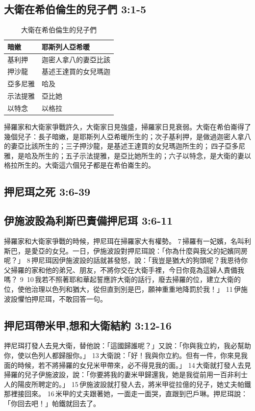 \subsection{大衛在希伯倫生的兒子們 3:1-5}
\begin{table}
\vspace*{-60mm}
\centering 
\begin{tabular}{p{1.5cm}|p{3.85cm}}\hline\hline
暗嫩&耶斯列人亞希暖 \\\hline
基利押&迦密人拿八的妻亞比該\\\hline
押沙龍&基述王達買的女兒瑪迦\\\hline
亞多尼雅&哈及\\\hline
示法提雅&亞比她\\\hline
以特念&以格拉\\\hline
\end{tabular}
\caption{大衛在希伯倫生的兒子們}
\end{table}
掃羅家和大衛家爭戰許久，大衛家日見強盛，掃羅家日見衰弱。大衛在希伯崙得了幾個兒子：長子暗嫩，是耶斯列人亞希暖所生的；次子基利押，是做過迦密人拿八的妻亞比該所生的；三子押沙龍，是基述王達買的女兒瑪迦所生的； 四子亞多尼雅，是哈及所生的；五子示法提雅，是亞比她所生的；六子以特念，是大衛的妻以格拉所生的。大衛這六個兒子都是在希伯崙生的。


\subsection{押尼珥之死 3:6-39}
\subsection{伊施波設為利斯巴責備押尼珥 3:6-11}
掃羅家和大衛家爭戰的時候，押尼珥在掃羅家大有權勢。 7 掃羅有一妃嬪，名叫利斯巴，是愛亞的女兒。一日，伊施波設對押尼珥說：「你為什麼與我父的妃嬪同房呢？」 8 押尼珥因伊施波設的話就甚發怒，說：「我豈是猶大的狗頭呢？我恩待你父掃羅的家和他的弟兄、朋友，不將你交在大衛手裡，今日你竟為這婦人責備我嗎？ 9  10 我若不照著耶和華起誓應許大衛的話行，廢去掃羅的位，建立大衛的位，使他治理以色列和猶大，從但直到別是巴，願神重重地降罰於我！」 11 伊施波設懼怕押尼珥，不敢回答一句。

\subsection{押尼珥帶米甲,想和大衛結約 3:12-16}
押尼珥打發人去見大衛，替他說：「這國歸誰呢？」又說：「你與我立約，我必幫助你，使以色列人都歸服你。」 13 大衛說：「好！我與你立約。但有一件，你來見我面的時候，若不將掃羅的女兒米甲帶來，必不得見我的面。」 14 大衛就打發人去見掃羅的兒子伊施波設，說：「你要將我的妻米甲歸還我，她是我從前用一百非利士人的陽皮所聘定的。」 15 伊施波設就打發人去，將米甲從拉億的兒子，她丈夫帕鐵那裡接回來。 16 米甲的丈夫跟著她，一面走一面哭，直跟到巴戶琳。押尼珥說：「你回去吧！」帕鐵就回去了。

